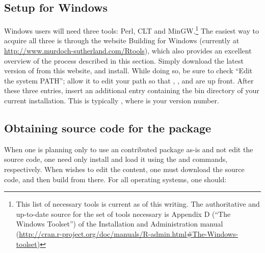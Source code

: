 \documentclass[nojss]{jss}
\begin{document}
\subsection{Setup for Windows}
\label{AcqTools}

Windows users will need three tools: Perl, CLT and MinGW.\footnote{This list of necessary tools is current as of this writing. The authoritative and up-to-date source for the set of tools necessary is Appendix D (``The Windows Toolset'') of the  Installation and Administration manual (\url{http://cran.r-project.org/doc/manuals/R-admin.html\#The-Windows-toolset})} The easiest way to acquire all three is through the website Building  for Windows (currently at \url{http://www.murdoch-sutherland.com/Rtools}), which also provides an excellent overview of the process described in this section.  Simply download the latest version of  from this website, and install.  While doing so, be sure to check ``Edit the system PATH''; allow it to edit your path so that , , and  are up front. After these three entries, insert an additional entry containing the bin directory of your current  installation.  This is typically , where  is your  version number.


\subsection[Obtaining source code for the ergm.userterms package]{Obtaining source code for the  package}
\label{Source}

When one is planning only to use an  contributed package as-is and
not edit the source code, one need only install and load it using the  and  commands, respectively.
When wishes to edit the content, one must download the source code,
and then build from there. For all operating systems, one should:
\end{document}
